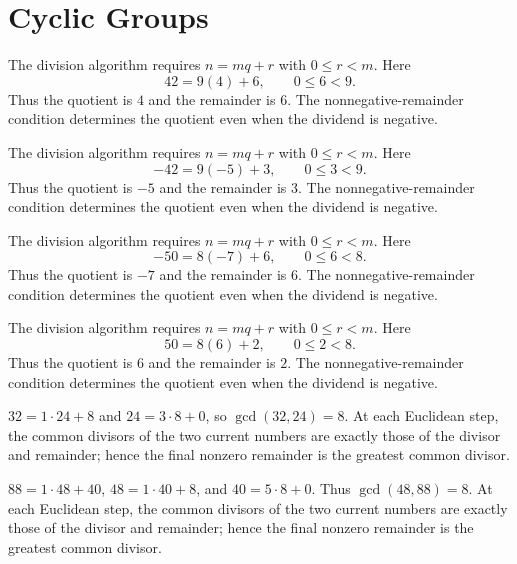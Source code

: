 \section{Cyclic Groups}


The division algorithm requires $n=mq+r$ with $0\le r<m$. Here
\[42=9(4)+6,\qquad0\le 6<9.
\]
Thus the quotient is $4$ and the remainder is $6$. The nonnegative-remainder condition determines the quotient even when the dividend is negative.


The division algorithm requires $n=mq+r$ with $0\le r<m$. Here
\[-42=9(-5)+3,\qquad0\le 3<9.
\]
Thus the quotient is $-5$ and the remainder is $3$. The nonnegative-remainder condition determines the quotient even when the dividend is negative.


The division algorithm requires $n=mq+r$ with $0\le r<m$. Here
\[-50=8(-7)+6,\qquad0\le 6<8.
\]
Thus the quotient is $-7$ and the remainder is $6$. The nonnegative-remainder condition determines the quotient even when the dividend is negative.


The division algorithm requires $n=mq+r$ with $0\le r<m$. Here
\[50=8(6)+2,\qquad0\le 2<8.
\]
Thus the quotient is $6$ and the remainder is $2$. The nonnegative-remainder condition determines the quotient even when the dividend is negative.


$32=1\cdot24+8$ and $24=3\cdot8+0$, so $\gcd(32,24)=8$. At each Euclidean step, the common divisors of the two current numbers are exactly those of the divisor and remainder; hence the final nonzero remainder is the greatest common divisor.


$88=1\cdot48+40$, $48=1\cdot40+8$, and $40=5\cdot8+0$. Thus $\gcd(48,88)=8$. At each Euclidean step, the common divisors of the two current numbers are exactly those of the divisor and remainder; hence the final nonzero remainder is the greatest common divisor.



